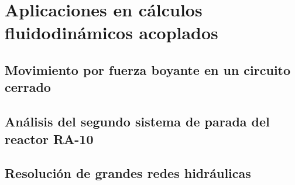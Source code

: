 \chapter{Aplicaciones en cálculos fluidodinámicos acoplados}

\section{Movimiento por fuerza boyante en un circuito cerrado}
\label{4:ff}

\section{Análisis del segundo sistema de parada del reactor RA-10}
\label{4:ra10}

\section{Resolución de grandes redes hidráulicas}
\label{4:redes}
